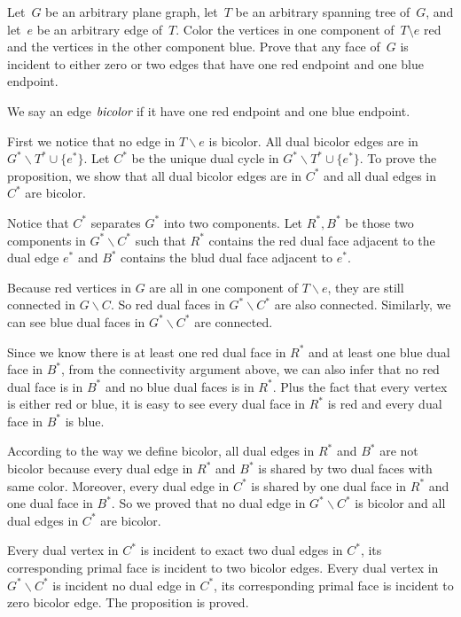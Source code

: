 \documentclass[11pt]{article}
\begin{document}
Let~\(G\) be an arbitrary plane graph, let~\(T\) be an arbitrary spanning tree of~\(G\), and
let~\(e\) be an arbitrary edge of~\(T\).
Color the vertices in one component of~\(T \setminus e\) red and the vertices in the other
component blue.
Prove that any face of~\(G\) is incident to either zero or two edges that have one red endpoint
and one blue endpoint.

\begin{solution}
  We say an edge \(\emph{bicolor}\) if it have one red endpoint and one blue endpoint.

  First we notice that no edge in \(T\backslash e\) is bicolor. All dual bicolor edges are in \(G^*\backslash T^* \cup \{e^*\}\).
  Let \(C^*\) be the unique dual cycle in \(G^*\backslash T^* \cup \{e^*\}\).
  To prove the proposition, we show that all dual bicolor edges are in \(C^*\) and all dual edges in \(C^*\) are bicolor.

  Notice that \(C^*\) separates \(G^*\) into two components.
  Let \(R^*,B^*\) be those two components in \(G^*\backslash C^*\) such that \(R^*\) contains the red dual face adjacent to the dual edge \(e^*\) and \(B^*\) contains the blud dual face adjacent to \(e^*\).

  Because red vertices in \(G\) are all in one component of \(T\backslash e\), they are still connected in \(G\backslash C\).
  So red dual faces in \(G^*\backslash C^*\) are also connected.
  Similarly, we can see blue dual faces in \(G^*\backslash C^*\) are connected.

  Since we know there is at least one red dual face in \(R^*\) and at least one blue dual face in \(B^*\), from the connectivity argument above, we can also infer that no red dual face is in \(B^*\) and no blue dual faces is in \(R^*\).
  Plus the fact that every vertex is either red or blue, it is easy to see every dual face in \(R^*\) is red and every dual face in \(B^*\) is blue.


  According to the way we define bicolor, all dual edges in \(R^*\) and \(B^*\) are not bicolor because every dual edge in \(R^*\) and \(B^*\) is shared by two dual faces with same color.
  Moreover, every dual edge in \(C^*\) is shared by one dual face in \(R^*\) and one dual face in \(B^*\).
  So we proved that no dual edge in \(G^*\backslash C^*\) is bicolor and all dual edges in \(C^*\) are bicolor.

  Every dual vertex in \(C^*\) is incident to exact two dual edges in \(C^*\), its corresponding primal face is incident to two bicolor edges. Every dual vertex in \(G^*\backslash C^*\) is incident no dual edge in \(C^*\), its corresponding primal face is incident to zero bicolor edge. The proposition is proved.


\end{solution}
\end{document}
